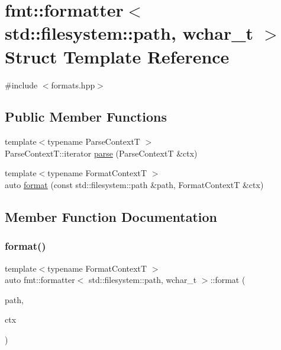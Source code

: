 \hypertarget{structfmt_1_1formatter_3_01std_1_1filesystem_1_1path_00_01wchar__t_01_4}{}\section{fmt\+:\+:formatter$<$ std\+:\+:filesystem\+:\+:path, wchar\+\_\+t $>$ Struct Template Reference}
\label{structfmt_1_1formatter_3_01std_1_1filesystem_1_1path_00_01wchar__t_01_4}


{\ttfamily \#include $<$formats.\+hpp$>$}

\subsection*{Public Member Functions}
\begin{DoxyCompactItemize}
\item 
{\footnotesize template$<$typename Parse\+ContextT $>$ }\\Parse\+Context\+T\+::iterator \mbox{\hyperlink{structfmt_1_1formatter_3_01std_1_1filesystem_1_1path_00_01wchar__t_01_4_a2d91172758430a7e1635ba053305b9f1}{parse}} (Parse\+ContextT \&ctx)
\item 
{\footnotesize template$<$typename Format\+ContextT $>$ }\\auto \mbox{\hyperlink{structfmt_1_1formatter_3_01std_1_1filesystem_1_1path_00_01wchar__t_01_4_a0f5942ed46b1e21798433640ddc3d9b0}{format}} (const std\+::filesystem\+::path \&path, Format\+ContextT \&ctx)
\end{DoxyCompactItemize}


\subsection{Member Function Documentation}
\mbox{\label{structfmt_1_1formatter_3_01std_1_1filesystem_1_1path_00_01wchar__t_01_4_a0f5942ed46b1e21798433640ddc3d9b0}} 
\subsubsection{\texorpdfstring{format()}{format()}}
{\footnotesize\ttfamily template$<$typename Format\+ContextT $>$ \\
auto fmt\+::formatter$<$ std\+::filesystem\+::path, wchar\+\_\+t $>$\+::format (\begin{DoxyParamCaption}\item[{const std\+::filesystem\+::path \&}]{path,  }\item[{Format\+ContextT \&}]{ctx }\end{DoxyParamCaption})}

